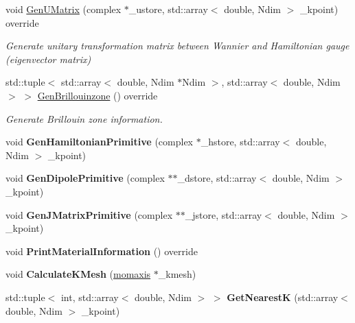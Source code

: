 \begin{DoxyCompactItemize}
void \hyperlink{class_tight_binding_a4bbc4705b8a3d3c45b1474740ec3c93b}{Gen\+U\+Matrix} (complex $\ast$\+\_\+ustore, std\+::array$<$ double, Ndim $>$ \+\_\+kpoint) override
\begin{DoxyCompactList}\small\item\em Generate unitary transformation matrix between Wannier and Hamiltonian gauge (eigenvector matrix) \end{DoxyCompactList}\item 
std\+::tuple$<$ std\+::array$<$ double, Ndim $\ast$Ndim $>$, std\+::array$<$ double, Ndim $>$ $>$ \hyperlink{class_tight_binding_a81458687424088fd6e549b861dc42ae4}{Gen\+Brillouinzone} () override
\begin{DoxyCompactList}\small\item\em Generate Brillouin zone information. \end{DoxyCompactList}\item 
\mbox{\label{class_tight_binding_ac10db4d7fd190ba0422dda22909b256c}} 
void {\bfseries Gen\+Hamiltonian\+Primitive} (complex $\ast$\+\_\+hstore, std\+::array$<$ double, Ndim $>$ \+\_\+kpoint)
\item 
\mbox{\label{class_tight_binding_ac9b3112f03fca1bb75381a2d2c7ff3d3}} 
void {\bfseries Gen\+Dipole\+Primitive} (complex $\ast$$\ast$\+\_\+dstore, std\+::array$<$ double, Ndim $>$ \+\_\+kpoint)
\item 
\mbox{\label{class_tight_binding_a9638f91d3e9efd01fc4606f2ccfdf490}} 
void {\bfseries Gen\+J\+Matrix\+Primitive} (complex $\ast$$\ast$\+\_\+jstore, std\+::array$<$ double, Ndim $>$ \+\_\+kpoint)
\item 
\mbox{\label{class_tight_binding_a48f82a1903b63a1f6c5deb71a4af285f}} 
void {\bfseries Print\+Material\+Information} () override
\item 
\mbox{\label{class_tight_binding_a43359098fd945f8d766298de64c2f1be}} 
void {\bfseries Calculate\+K\+Mesh} (\hyperlink{classmomaxis}{momaxis} $\ast$\+\_\+kmesh)
\item 
\mbox{\label{class_tight_binding_a1456b4c343f9d3da68b6aa2af0866a6d}} 
std\+::tuple$<$ int, std\+::array$<$ double, Ndim $>$ $>$ {\bfseries Get\+NearestK} (std\+::array$<$ double, Ndim $>$ \+\_\+kpoint)
\end{DoxyCompactItemize}
